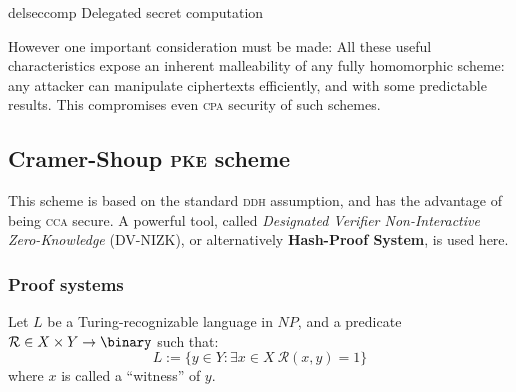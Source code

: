 
\begin{cryptosequence}
    {delseccomp}
    {Delegated secret computation}


    \cseqdelay


    \cseqdelay
    \cseqdelay


\end{cryptosequence}


However one important consideration must be made: All these useful characteristics expose an inherent malleability of any fully homomorphic scheme: any attacker can manipulate ciphertexts efficiently, and with some predictable results. This compromises even \textsc{cpa} security of such schemes.

\subsection{Cramer-Shoup \textsc{pke} scheme}

This scheme is based on the standard \textsc{ddh} assumption, and has the advantage of being \textsc{cca} secure. A powerful tool, called \emph{Designated Verifier Non-Interactive Zero-Knowledge} (\textsc{DV-NIZK}), or alternatively \textbf{Hash-Proof System}, is used here.

\subsubsection{Proof systems}

Let $L$ be a Turing-recognizable language in $NP$, and a predicate $\mathcal{R} \in X \times Y \to \binary$ such that:
\begin{equation*}
    L := \{y \in Y : \exists x \in X \: \mathcal{R}(x, y) = 1\}
\end{equation*}
where $x$ is called a ``witness'' of $y$.

